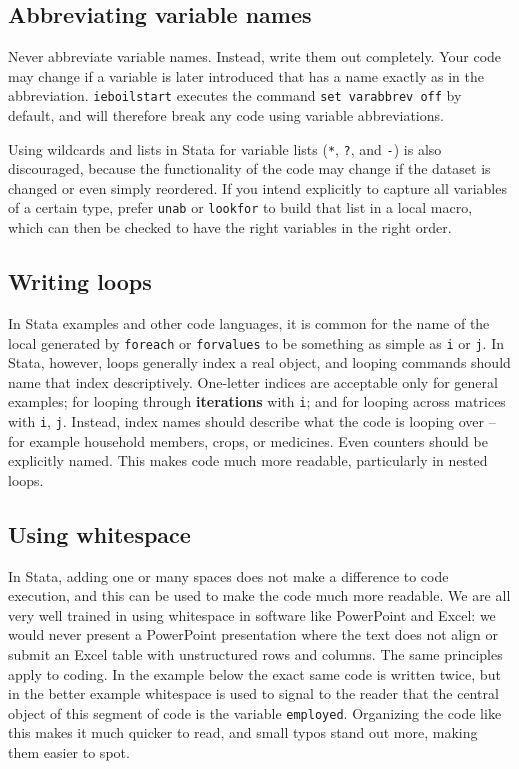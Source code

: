 \subsection{Abbreviating variable names}

Never abbreviate variable names. Instead, write them out completely.
Your code may change if a variable is later introduced
that has a name exactly as in the abbreviation.
\texttt{ieboilstart} executes the command \texttt{set varabbrev off} by default,
and will therefore break any code using variable abbreviations.

Using wildcards and lists in Stata for variable lists
(\texttt{*}, \texttt{?}, and \texttt{-}) is also discouraged,
because the functionality of the code may change
if the dataset is changed or even simply reordered.
If you intend explicitly to capture all variables of a certain type,
prefer \texttt{unab} or \texttt{lookfor} to build that list in a local macro,
which can then be checked to have the right variables in the right order.

\subsection{Writing loops}

In Stata examples and other code languages, it is common for the name of the local generated by \texttt{foreach} or \texttt{forvalues}
to be something as simple as \texttt{i} or \texttt{j}. In Stata, however,
loops generally index a real object, and looping commands should name that index descriptively.
One-letter indices are acceptable only for general examples;
for looping through \textbf{iterations} with \texttt{i};
and for looping across matrices with \texttt{i}, \texttt{j}.
Instead, index names should describe what the code is looping over --
for example household members, crops, or medicines.
Even counters should be explicitly named.
This makes code much more readable, particularly in nested loops.


\subsection{Using whitespace}

In Stata, adding one or many spaces does not make a difference to code execution,
and this can be used to make the code much more readable.
We are all very well trained in using whitespace in software like PowerPoint and Excel:
we would never present a PowerPoint presentation where the text does not align
or submit an Excel table with unstructured rows and columns.
The same principles apply to coding.
In the example below the exact same code is written twice,
but in the better example whitespace is used to signal to the reader
that the central object of this segment of code is the variable \texttt{employed}.
Organizing the code like this makes it much quicker to read,
and small typos stand out more, making them easier to spot.

